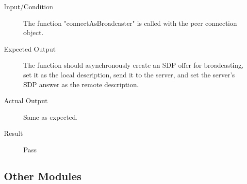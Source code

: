 \documentclass[12pt, titlepage]{article}
\begin{document}
\begin{enumerate}[UT-RC1]
\begin{description}
    \item[Input/Condition] The function "connectAsBroadcaster" is called with the peer connection object.
    \item[Expected Output] The function should asynchronously create an SDP offer for broadcasting, set it as the local description, send it to the server, and set the server's SDP answer as the remote description.
    \item[Actual Output] Same as expected.
    \item[Result] Pass
    \end{description}
\end{enumerate}

\subsection{Other Modules}
\end{document}
